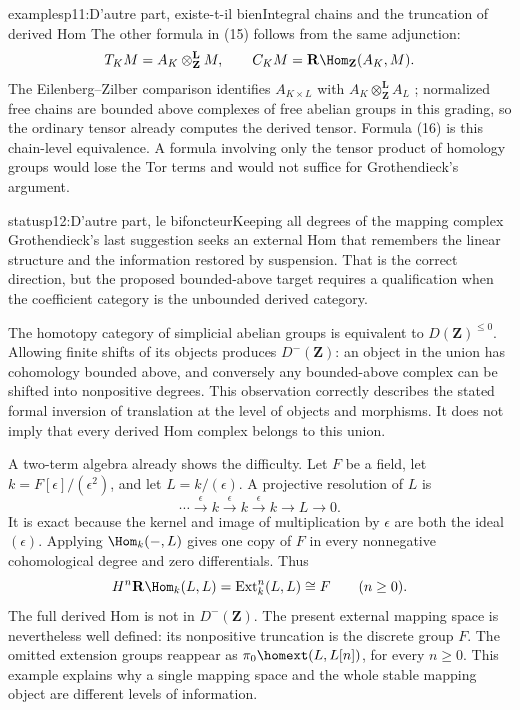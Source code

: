 \begin{dcomment}{examples}{p11:D’autre part, existe-t-il bien}{Integral chains and the truncation of derived Hom}
The other formula in (15) follows from the same adjunction:
\[
 T_KM=A_K\otimes_{\mathbf Z}^{\mathbf L}M,\qquad
 C_KM=\mathbf R\Hom_{\mathbf Z}(A_K,M).
\]
The Eilenberg--Zilber comparison identifies \(A_{K\times L}\) with \(A_K\otimes_{\mathbf Z}^{\mathbf L}A_L\) \citep[Section 1, theorem, pp.~200--201]{EilenbergZilber1953}; normalized free chains are bounded above complexes of free abelian groups in this grading, so the ordinary tensor already computes the derived tensor. Formula (16) is this chain-level equivalence. A formula involving only the tensor product of homology groups would lose the Tor terms and would not suffice for Grothendieck's argument.
\end{dcomment}

\begin{dcomment}{status}{p12:D’autre part, le bifoncteur}{Keeping all degrees of the mapping complex}
Grothendieck's last suggestion seeks an external Hom that remembers the linear structure and the information restored by suspension. That is the correct direction, but the proposed bounded-above target requires a qualification when the coefficient category is the unbounded derived category.

The homotopy category of simplicial abelian groups is equivalent to \(D(\mathbf Z)^{\leq0}\). Allowing finite shifts of its objects produces \(D^-(\mathbf Z)\): an object in the union has cohomology bounded above, and conversely any bounded-above complex can be shifted into nonpositive degrees. This observation correctly describes the stated formal inversion of translation at the level of objects and morphisms. It does not imply that every derived Hom complex belongs to this union.

A two-term algebra already shows the difficulty. Let \(F\) be a field, let \(k=F[\epsilon]/(\epsilon^2)\), and let \(L=k/(\epsilon)\). A projective resolution of \(L\) is
\[
 \cdots\xrightarrow{\epsilon}k
 \xrightarrow{\epsilon}k
 \xrightarrow{\epsilon}k\longrightarrow L\longrightarrow0.
\]
It is exact because the kernel and image of multiplication by \(\epsilon\) are both the ideal \((\epsilon)\). Applying \(\Hom_k(-,L)\) gives one copy of \(F\) in every nonnegative cohomological degree and zero differentials. Thus
\[
 H^n\mathbf R\Hom_k(L,L)=\operatorname{Ext}^n_k(L,L)
 \cong F\qquad(n\geq0).
\]
The full derived Hom is not in \(D^-(\mathbf Z)\). The present external mapping space is nevertheless well defined: its nonpositive truncation is the discrete group \(F\). The omitted extension groups reappear as
\(\pi_0\homext(L,L[n])\), for every \(n\geq0\). This example explains why a single mapping space and the whole stable mapping object are different levels of information.


\end{dcomment}
